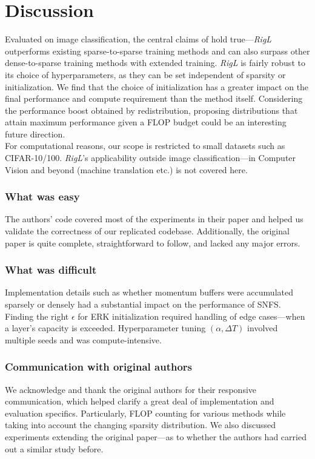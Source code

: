 \section{Discussion}

Evaluated on image classification, the central claims of \citet{rigl} hold true---\textit{RigL} outperforms existing sparse-to-sparse training methods and can also surpass other dense-to-sparse training methods with extended training. \textit{RigL} is fairly robust to its choice of hyperparameters, as they can be set independent of sparsity or initialization. We find that the choice of initialization has a greater impact on the final performance and compute requirement than the method itself. Considering the performance boost obtained by redistribution, proposing distributions that attain maximum performance given a FLOP budget could be an interesting future direction.\\

For computational reasons, our scope is restricted to small datasets such as CIFAR-10/100. \textit{RigL}'s applicability outside image classification---in Computer Vision and beyond (machine translation etc.) is not covered here.

\subsubsection{What was easy}
The authors' code covered most of the experiments in their paper and helped us validate the correctness of our replicated codebase. Additionally, the original paper is quite complete, straightforward to follow, and lacked any major errors.

\subsubsection{What was difficult}

Implementation details such as whether momentum buffers were accumulated sparsely or densely had a substantial impact on the performance of SNFS. Finding the right $\epsilon$ for ERK initialization required handling of edge cases---when a layer's capacity is exceeded. Hyperparameter tuning $(\alpha, \Delta T)$ involved multiple seeds and was compute-intensive.

\subsubsection{Communication with original authors}

We acknowledge and thank the original authors for their responsive communication, which helped clarify a great deal of implementation and evaluation specifics. Particularly, FLOP counting for various methods while taking into account the changing sparsity distribution. We also discussed experiments extending the original paper---as to whether the authors had carried out a similar study before.